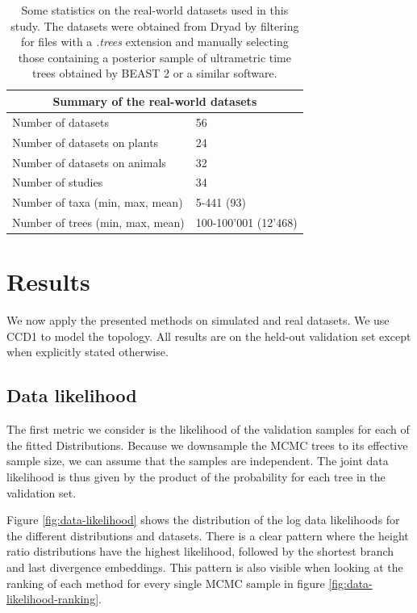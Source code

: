\documentclass[10pt,letterpaper]{article}
\begin{document}
\begin{table}[h!]
	\caption{Some statistics on the real-world datasets used in this study. The datasets were obtained from Dryad \cite{dryad} by filtering for files with a \emph{.trees} extension and manually selecting those containing a posterior sample of ultrametric time trees obtained by BEAST 2 or a similar software.}
	\label{table-bio-datasets}

	\centering
	\begin{tabular}{@{}ll@{}}
		\toprule
		\multicolumn{2}{c}{Summary of the real-world datasets} \\
		\midrule
		Number of datasets	& 56 \\
		Number of datasets on plants & 24 \\
		Number of datasets on animals & 32 \\
		Number of studies	& 34 \\
		Number of taxa (min, max, mean) & 5-441 (93) \\
		Number of trees (min, max, mean) & 100-100'001 (12'468) \\
		\bottomrule
	\end{tabular}
\end{table}

\section*{Results}

We now apply the presented methods on simulated and real datasets. We use CCD1 to model the topology. All results are on the held-out validation set except when explicitly stated otherwise.

\subsection*{Data likelihood}

The first metric we consider is the likelihood of the validation samples for each of the fitted Distributions. Because we downsample the MCMC trees to its effective sample size, we can assume that the samples are independent. The joint data likelihood is thus given by the product of the probability for each tree in the validation set.

Figure \ref{fig:data-likelihood} shows the distribution of the log data likelihoods for the different distributions and datasets. There is a clear pattern where the height ratio distributions have the highest likelihood, followed by the shortest branch and last divergence embeddings. This pattern is also visible when looking at the ranking of each method for every single MCMC sample in figure \ref{fig:data-likelihood-ranking}.
\end{document}
